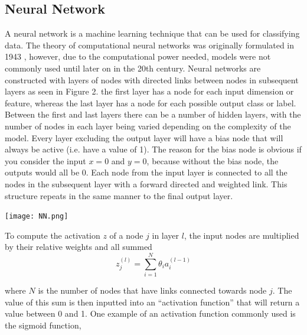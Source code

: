 \documentclass[a4paper,11pt,twoside]{article}
\begin{document}
\subsection{Neural Network}

A neural network is a machine learning technique that can be used for classifying data. The theory of computational neural networks was originally formulated in 1943 \cite{McCulloch1943}, however, due to the computational power needed, models were not commonly used until later on in the 20th century.  
\newline
\newline
Neural networks are constructed with layers of nodes with directed links between nodes in subsequent layers as seen in Figure 2. the first layer has a node for each input dimension or feature, whereas the last layer has a node for each possible output class or label. Between the first and last layers there can be a number of hidden layers, with the number of nodes in each layer being varied depending on the complexity of the model. Every layer excluding the output layer will have a bias node that will always be active (i.e. have a value of 1). The reason for the bias node is obvious if you consider the input $x=0$ and $y=0$, because without the bias node, the outputs would all be 0. Each node from the input layer is connected to all the nodes in the subsequent layer with a forward directed and weighted link. This structure repeats in the same manner to the final output layer. 

\begin{center}
\texttt{[image: NN.png]}

\end{center}

To compute the activation $z$ of a node $j$ in layer $l$, the input nodes are multiplied by their relative weights and all summed
\begin{equation}
z^{(l)}_j = \sum_{i=1}^N \theta_i a^{(l-1)}_i
\end{equation}

where $N$ is the number of nodes that have links connected towards node $j$. The value of this sum is then inputted into an “activation function” that will return a value between 0 and 1. One example of an activation function commonly used is the sigmoid function, 
\end{document}
